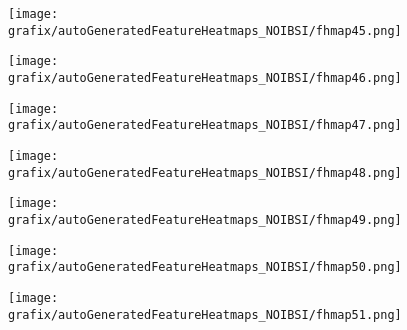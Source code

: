 \begin{subfigure}{\wid\textwidth} 
    \centering 
    \caption{\tiny \sffamily {}} 
    \vspace{\vsp} 
    \texttt{[image: grafix/autoGeneratedFeatureHeatmaps\_NOIBSI/fhmap45.png]} 
\end{subfigure} 
\hspace{\hsp} 
\begin{subfigure}{\wid\textwidth} 
    \centering 
    \caption{\tiny \sffamily {}} 
    \vspace{\vsp} 
    \texttt{[image: grafix/autoGeneratedFeatureHeatmaps\_NOIBSI/fhmap46.png]} 
\end{subfigure} 
\hspace{\hsp} 
\begin{subfigure}{\wid\textwidth} 
    \centering 
    \caption{\tiny \sffamily {}} 
    \vspace{\vsp} 
    \texttt{[image: grafix/autoGeneratedFeatureHeatmaps\_NOIBSI/fhmap47.png]} 
\end{subfigure} 
\hspace{\hsp} 
\begin{subfigure}{\wid\textwidth} 
    \centering 
    \caption{\tiny \sffamily {}} 
    \vspace{\vsp} 
    \texttt{[image: grafix/autoGeneratedFeatureHeatmaps\_NOIBSI/fhmap48.png]} 
\end{subfigure} 
\hspace{\hsp} 
\begin{subfigure}{\wid\textwidth} 
    \centering 
    \caption{\tiny \sffamily {}} 
    \vspace{\vsp} 
    \texttt{[image: grafix/autoGeneratedFeatureHeatmaps\_NOIBSI/fhmap49.png]} 
\end{subfigure} 
\hspace{\hsp} 
\begin{subfigure}{\wid\textwidth} 
    \centering 
    \caption{\tiny \sffamily {}} 
    \vspace{\vsp} 
    \texttt{[image: grafix/autoGeneratedFeatureHeatmaps\_NOIBSI/fhmap50.png]} 
\end{subfigure} 
\hspace{\hsp} 
\begin{subfigure}{\wid\textwidth} 
    \centering 
    \caption{\tiny \sffamily {}} 
    \vspace{\vsp} 
    \texttt{[image: grafix/autoGeneratedFeatureHeatmaps\_NOIBSI/fhmap51.png]} 
\end{subfigure} 

